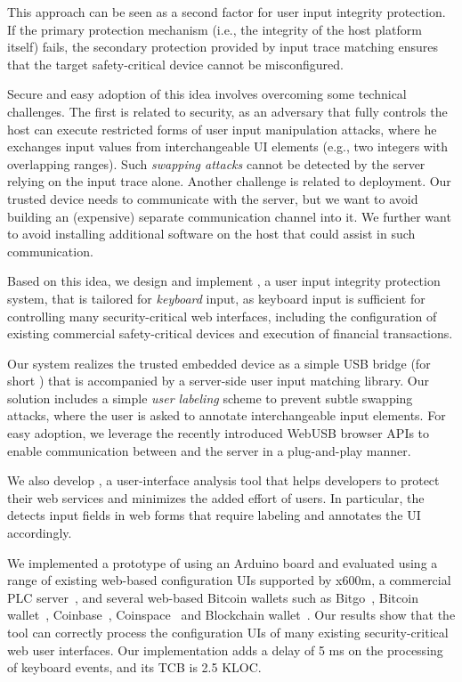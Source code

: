 This approach can be seen as a second factor for user input integrity protection. If the primary protection mechanism (i.e., the integrity of the host platform itself) fails, the secondary protection provided by input trace matching ensures that the target safety-critical device cannot be misconfigured.

Secure and easy adoption of this idea involves overcoming some technical challenges. The first is related to security, as an adversary that fully controls the host can execute restricted forms of user input manipulation attacks, where he exchanges input values from interchangeable UI elements (e.g., two integers with overlapping ranges). Such \emph{swapping attacks} cannot be detected by the server relying on the input trace alone. Another challenge is related to deployment. Our trusted device needs to communicate with the server, but we want to avoid building an (expensive) separate communication channel into it. We further want to avoid installing additional software on the host that could assist in such communication. 


 Based on this idea, we design and implement \name, a user input integrity protection system, that is tailored for \emph{keyboard} input, as keyboard input is sufficient for controlling many security-critical web interfaces, including the configuration of existing commercial safety-critical devices and execution of financial transactions.

Our system realizes the trusted embedded device as a simple USB bridge (for short \device) that is accompanied by a server-side user input matching library. Our solution includes a simple \emph{user labeling} scheme to prevent subtle swapping attacks, where the user is asked to annotate interchangeable input elements. For easy adoption, we leverage the recently introduced WebUSB browser APIs to enable communication between \device and the server in a plug-and-play manner. 

We also develop \tool, a user-interface analysis tool that helps developers to protect their web services and minimizes the added effort of users. In particular, the \tool detects input fields in web forms that require labeling and annotates the UI accordingly. 

We implemented a prototype of \device using an Arduino board and evaluated \tool using a range of existing web-based configuration UIs supported by x600m, a commercial PLC server~\cite{controlbyweb}, and several web-based Bitcoin wallets such as Bitgo~\cite{bitgo}, Bitcoin wallet~\cite{bitcoinwallet}, Coinbase~\cite{coinbase}, Coinspace~\cite{coin} and Blockchain wallet~\cite{blockchain}. Our results show that the tool can correctly process the configuration UIs of many existing security-critical web user interfaces. Our \device implementation adds a delay of 5 ms on the processing of keyboard events, and its TCB is 2.5 KLOC. 

